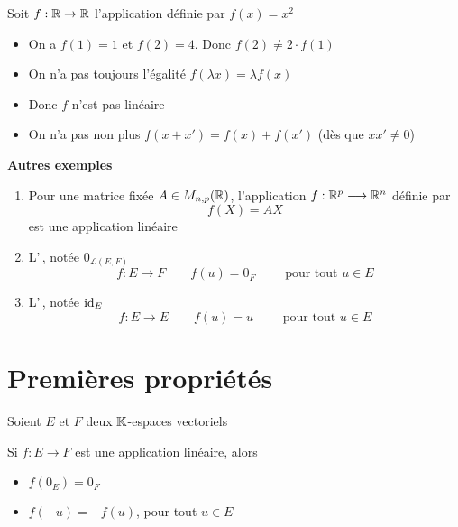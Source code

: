 \begin{frame}

\begin{exemple}
Soit $f : \mathbb{R} \to \mathbb{R}$ l'application définie par $f(x)=x^2$
\pause
\begin{itemize}\setlength{\itemsep}{6pt}
  \item On a $f(1)=1$ et $f(2)=4$. Donc $f(2) \neq 2 \cdot f(1)$
\pause  
  \item On n'a pas toujours l'égalité $f(\lambda x)=\lambda f(x)$
\pause   
  \item Donc $f$ n'est pas linéaire
\pause  
  \item On n'a pas non plus $f(x+x')=f(x)+f(x')$ (dès que $xx'\neq0$)
\end{itemize}
\end{exemple}
\end{frame}


\begin{frame}
\hfill{\textbf{Autres exemples}}
\bigskip


\begin{enumerate}\setlength{\itemsep}{6pt}
\item Pour une matrice fixée $A \in M_{n,p}(\mathbb{R})$, 
l'application $f : \mathbb{R}^p \longrightarrow \mathbb{R}^n$ définie par 
$$f(X) = AX$$
est une application linéaire

\pause

\item L'\,, notée $0_{\mathcal{L}(E,F)}$  
$$f : E \longrightarrow F 
\qquad f(u) = 0_F \qquad \text{ pour tout }u \in E$$

\pause

\item L'\,, notée $\mathop{\text{id}}\nolimits_E$ 
$$f : E \longrightarrow E 
\qquad f(u) = u \qquad \text{ pour tout }u \in E$$
\end{enumerate}
\end{frame}

\section{Premières propriétés}

\begin{frame}
Soient $E$ et $F$ deux $\mathbb{K}$-espaces vectoriels

\begin{proposition}
Si $f : E \longrightarrow F$ est une 
application linéaire, alors 
\begin{itemize}
  \item $f(0_{E})=0_{F}$
  \item $f(-u)=-f(u)$, pour tout $u \in E$
\end{itemize}
\end{proposition}
\end{frame}


